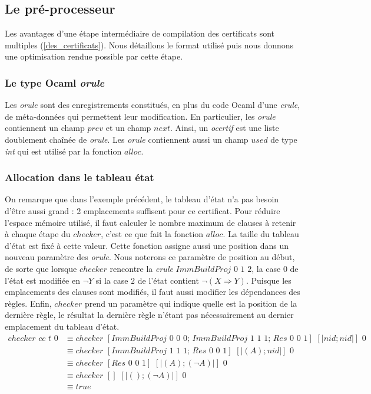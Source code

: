 \documentclass[11pt]{article}
\begin{document}
\subsection{Le pré-processeur}

Les avantages d'une étape intermédiaire de compilation des certificats sont multiples (\ref{des_certificats}). Nous détaillons le format utilisé puis nous donnons une optimisation rendue possible par cette étape.

\subsubsection{Le type Ocaml \textit{orule}}

 Les \textit{orule} sont des enregistrements constitués, en plus du code Ocaml d'une \textit{crule}, de méta-données qui permettent leur modification. En particulier, les \textit{orule} contiennent un champ $prev$ et un champ $next$. Ainsi, un \textit{ocertif} est une liste doublement chaînée de \textit{orule}. Les \textit{orule} contiennent aussi un champ $used$ de type \textit{int} qui est utilisé par la fonction $alloc$.


\subsubsection{Allocation dans le tableau état} \label{alloc}

On remarque que dans l'exemple précédent, le tableau d'état n'a pas besoin d'être aussi grand : 2 emplacements suffisent pour ce certificat. Pour réduire l'espace mémoire utilisé, il faut calculer le nombre maximum de clauses à retenir à chaque étape du $checker$, c'est ce que fait la fonction $alloc$. La taille du tableau d'état est fixé à cette valeur. Cette fonction assigne aussi une position dans un nouveau paramètre des \textit{orule}. Nous noterons ce paramètre de position au début, de sorte que lorsque $checker$ rencontre la \textit{crule} $ImmBuildProj \,\, 0\,\, 1 \,\, 2$, la case $0$ de l'état est modifiée en $\neg Y$ si la case $2$ de l'état contient $\neg(X \Rightarrow Y)$. Puisque les emplacements des clauses sont modifiés, il faut aussi modifier les dépendances des règles. Enfin, $checker$ prend un paramètre qui indique quelle est la position de la dernière règle, le résultat la dernière règle n'étant pas nécessairement au dernier emplacement du tableau d'état.  
\begin{align*}
    checker \,\, cc \,\, t \,\, 0 &\equiv checker \,\, [ImmBuildProj \,\, 0\,\, 0 \,\, 0; \,ImmBuildProj \,\, 1\,\, 1 \,\, 1; \, Res \,\, 0 \,\, 0 \,\, 1] \,\, [| nid; nid|] \,\, 0 \\
    &\equiv checker \,\, [ImmBuildProj \,\, 1 \,\, 1 \,\, 1; \, Res \,\, 0 \,\, 0 \,\, 1] \,\, [| (A); nid|] \,\, 0 \\
    &\equiv checker \,\, [Res \,\, 0 \,\, 0 \,\, 1] \,\, [| (A); (\neg A)|] \,\, 0 \\
    &\equiv checker \,\, [] \,\, [| (); (\neg A)|] \,\, 0 \\
    &\equiv true
\end{align*}
\end{document}
